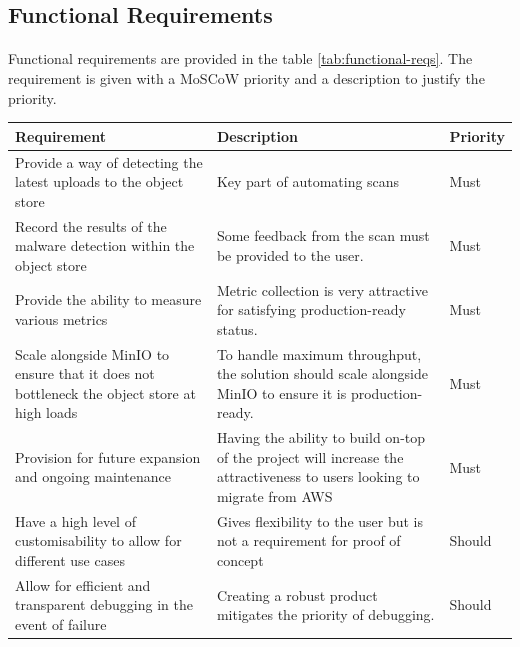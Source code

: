 \documentclass[12pt, conference, final, a4paper, onecolumn, compsoc]{IEEEtran}
\begin{document}
\subsection*{Functional Requirements}
\paragraph{}

Functional requirements are provided in the table \ref{tab:functional-reqs}. The
requirement is given with a MoSCoW priority and a description to justify the
priority.

\begin{table}[H]
  \centering
  \begin{tabular}{|p{}|p{}|l|} \hline
    \textbf{Requirement} & \textbf{Description} & \textbf{Priority} \\ \hline
Provide a way of detecting the latest uploads to the object store & Key part of
automating scans & Must \\ \hline Record the results of the malware detection
within the object store & Some feedback from the scan must be provided to the
user. & Must \\ \hline Provide the ability to measure various metrics & Metric
collection is very attractive for satisfying production-ready status. & Must \\
\hline Scale alongside MinIO to ensure that it does not bottleneck the object
store at high loads & To handle maximum throughput, the solution should scale
alongside MinIO to ensure it is production-ready. & Must \\ \hline Provision for
future expansion and ongoing maintenance & Having the ability to build on-top of
the project will increase the attractiveness to users looking to migrate from
                                           AWS & Must \\ \hline
    \hline

    Have a high level of customisability to allow for different use cases &
Gives flexibility to the user but is not a requirement for proof of concept &
Should \\ \hline Allow for efficient and transparent debugging in the event of
    failure & Creating a robust product mitigates the priority of debugging. & Should \\ \hline


\end{tabular}
\end{table}
\end{document}
